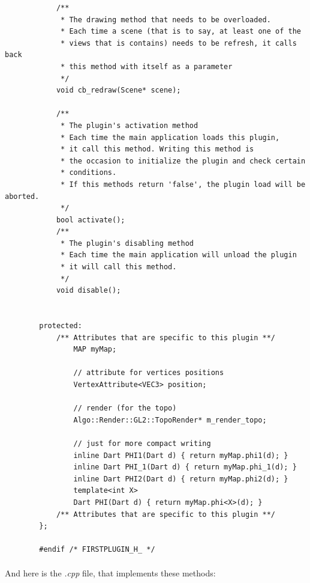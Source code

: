 \documentclass[a4paper]{scrreprt}
\begin{document}
\begin{lstlisting}
			/**
			 * The drawing method that needs to be overloaded.
			 * Each time a scene (that is to say, at least one of the
			 * views that is contains) needs to be refresh, it calls back
			 * this method with itself as a parameter
			 */
			void cb_redraw(Scene* scene);
		
			/**
			 * The plugin's activation method
			 * Each time the main application loads this plugin,
			 * it call this method. Writing this method is
			 * the occasion to initialize the plugin and check certain
			 * conditions.
			 * If this methods return 'false', the plugin load will be aborted.
			 */
			bool activate();
			/**
			 * The plugin's disabling method
			 * Each time the main application will unload the plugin
			 * it will call this method.
			 */
			void disable();
		
		
		protected:
			/** Attributes that are specific to this plugin **/
				MAP myMap;
		
				// attribute for vertices positions
				VertexAttribute<VEC3> position;
		
				// render (for the topo)
				Algo::Render::GL2::TopoRender* m_render_topo;
		
				// just for more compact writing
				inline Dart PHI1(Dart d) { return myMap.phi1(d); }
				inline Dart PHI_1(Dart d) { return myMap.phi_1(d); }
				inline Dart PHI2(Dart d) { return myMap.phi2(d); }
				template<int X>
				Dart PHI(Dart d) { return myMap.phi<X>(d); }
			/** Attributes that are specific to this plugin **/
		};
		
		#endif /* FIRSTPLUGIN_H_ */
	\end{lstlisting}
	\paragraph{}
	And here is the \textit{.cpp} file, that implements these methods:
\end{document}
